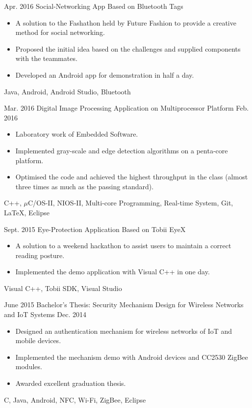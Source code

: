 \begin{projects}
  
  \project
    {Apr. 2016}     {Social-Networking App Based on Bluetooth Tags}
    {}    {
                      \begin{itemize}
                       \item A solution to the Fashathon held by Future Fashion to provide a creative method for social networking.
                       \item Proposed the initial idea based on the challenges and supplied components with the teammates.
						\item Developed an Android app for demonstration in half a day.
                      \end{itemize}
                    }
                    {Java, Android, Android Studio, Bluetooth}
  \emptySeparator
  
  
  \project
  {Mar. 2016}       {Digital Image Processing Application on Multiprocessor Platform}
  {Feb. 2016}      {
                      \begin{itemize}
                       \item Laboratory work of Embedded Software.
						\item Implemented gray-scale and edge detection algorithms on a penta-core platform.
						\item Optimised the code and achieved the highest throughput in the class (almost three times as much as the passing standard).
                      \end{itemize}
                    }
                    {C++, $\mu$C/OS-II, NIOS-II, Multi-core Programming, Real-time System, Git, \LaTeX, Eclipse}
  \emptySeparator
  
  \project
  {Sept. 2015}		{Eye-Protection Application Based on Tobii EyeX}
  {}				{\begin{itemize}
  						\item A solution to a weekend hackathon to assist users to maintain a correct reading posture.
						\item Implemented the demo application with Visual C++ in one day.
  					\end{itemize} 
                    }
                    {Visual C++, Tobii SDK, Visual Studio}
\emptySeparator


  \project
  {June 2015}		{Bachelor's Thesis: Security Mechanism Design for Wireless Networks and IoT Systems}
  {Dec. 2014}		{\begin{itemize}
  						\item Designed an authentication mechanism for wireless networks of IoT and mobile devices.
						\item Implemented the mechanism demo with Android devices and CC2530 ZigBee modules.
                        \item Awarded excellent graduation thesis.
  					\end{itemize} 
                    }
                    {C, Java, Android, NFC, Wi-Fi, ZigBee, Eclipse}
\emptySeparator



\end{projects}
